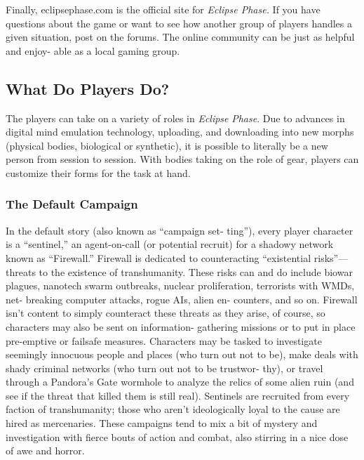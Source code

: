 Finally, eclipsephase.com is the official site for 
\textit{Eclipse Phase.} If you have questions about the 
game or want to see how another group of players 
handles a given situation, post on the forums. The 
online community can be just as helpful and enjoy-
able as a local gaming group.

\subsection{What Do Players Do?}

The players can take on a variety of roles in \textit{Eclipse }
\textit{Phase}. Due to advances in digital mind emulation 
technology, uploading, and downloading into new 
morphs (physical bodies, biological or synthetic), it is 
possible to literally be a new person from session to 
session. With bodies taking on the role of gear, players 
can customize their forms for the task at hand.

\subsubsection{The Default Campaign}

In the default story (also known as ``campaign set-
ting''), every player character is a ``sentinel,'' an 
agent-on-call (or potential recruit) for a shadowy 
network known as ``Firewall.'' Firewall is dedicated 
to counteracting ``existential risks''—threats to the 
existence of transhumanity. These risks can and do 
include biowar plagues, nanotech swarm outbreaks, 
nuclear proliferation, terrorists with WMDs, net-
breaking computer attacks, rogue AIs, alien en-
counters, and so on. Firewall isn't content to simply 
counteract these threats as they arise, of course, 
so characters may also be sent on information-
gathering missions or to put in place pre-emptive 
or failsafe measures. Characters may be tasked to 
investigate seemingly innocuous people and places 
(who turn out not to be), make deals with shady 
criminal networks (who turn out not to be trustwor-
thy), or travel through a Pandora's Gate wormhole 
to analyze the relics of some alien ruin (and see if 
the threat that killed them is still real). Sentinels 
are recruited from every faction of transhumanity; 
those who aren't ideologically loyal to the cause are 
hired as mercenaries. These campaigns tend to mix 
a bit of mystery and investigation with fierce bouts 
of action and combat, also stirring in a nice dose of 
awe and horror.

